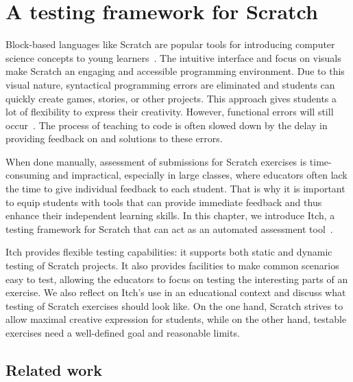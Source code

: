 \documentclass[../main]{subfiles}
\begin{document}
\chapter{A testing framework for Scratch}\label{ch:itch}


Block-based languages like Scratch are popular tools for introducing computer science concepts to young learners~\autocite{bauLearnableProgrammingBlocks2017,zhangSystematicReviewLearning2019}.
The intuitive interface and focus on visuals make Scratch an engaging and accessible programming environment.
Due to this visual nature, syntactical programming errors are eliminated and students can quickly create games, stories, or other projects.
This approach gives students a lot of flexibility to express their creativity.
However, functional errors will still occur~\autocite{zellerWhyProgramsFail2009a}.
The process of teaching to code is often slowed down by the delay in providing feedback on and solutions to these errors.

When done manually, assessment of submissions for Scratch exercises is time-consuming and impractical, especially in large classes, where educators often lack the time to give individual feedback to each student.
That is why it is important to equip students with tools that can provide immediate feedback and thus enhance their independent learning skills.
In this chapter, we introduce Itch, a testing framework for Scratch that can act as an automated assessment tool~\autocite{douceAutomaticTestbasedAssessment2005}.

Itch provides flexible testing capabilities: it supports both static and dynamic testing of Scratch projects.
It also provides facilities to make common scenarios easy to test, allowing the educators to focus on testing the interesting parts of an exercise.
We also reflect on Itch's use in an educational context and discuss what testing of Scratch exercises should look like.
On the one hand, Scratch strives to allow maximal creative expression for students, while on the other hand, testable exercises need a well-defined goal and reasonable limits.

\section{Related work}\label{sec:related-work}
\end{document}
